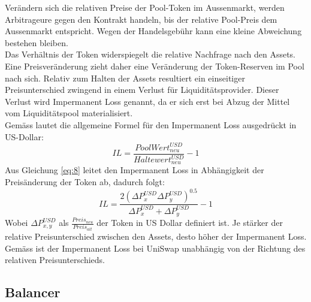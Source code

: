 \documentclass[12pt,a4paper,titlepage,oneside,english]{article}
\begin{document}
Verändern sich die relativen Preise der Pool-Token im Aussenmarkt, werden Arbitrageure gegen den Kontrakt handeln, bis der relative Pool-Preis dem Aussenmarkt entspricht. Wegen der Handelsgebühr kann eine kleine Abweichung bestehen bleiben. \citep[vgl.][S.4f.]{Angeris2019} \\
Das Verhältnis der Token widerspiegelt die relative Nachfrage nach den Assets. Eine Preisveränderung zieht daher eine Veränderung der Token-Reserven im Pool nach sich. 
Relativ zum Halten der Assets resultiert ein einseitiger Preisunterschied zwingend in einem Verlust für Liquiditätsprovider. Dieser Verlust wird Impermanent Loss genannt, da er sich erst bei Abzug der Mittel vom Liquiditätspool materialisiert. \citep[vgl.][]{Pintail2019}\\
Gemäss \citet{Martinelli2020} lautet die allgemeine Formel für den Impermanent Loss ausgedrückt in US-Dollar:
\begin{equation}
IL = \dfrac{Pool Wert^{USD}_{neu}}{Haltewert^{USD}_{neu}}-1 \label{eq:8}
\end{equation}
Aus Gleichung \ref{eq:8} leitet \citet{Martinelli2020} den Impermanent Loss in Abhängigkeit der Preisänderung der Token ab, dadurch folgt: %
\begin{equation}
IL =\dfrac{2 (\Delta P^{USD}_{x} \Delta P^{USD}_{y})^{0.5}}{\Delta P^{USD}_{x}+\Delta P^{USD}_{y}}-1 \label{eq:9}
\end{equation}
Wobei $\Delta P_{x,y}^{USD}$ als $\tfrac{Preis_{neu}}{Preis_{alt}}$ der Token in US Dollar definiert ist. Je stärker der relative Preisunterschied zwischen den Assets, desto höher der Impermanent Loss. Gemäss \cite{Pintail2019} ist der Impermanent Loss bei UniSwap unabhängig von der Richtung des relativen Preisunterschieds. %


\subsection{Balancer}
\end{document}
